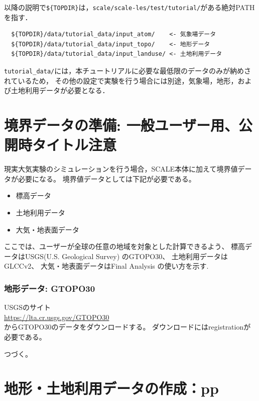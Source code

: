 以降の説明で\verb|${TOPDIR}|は，\verb|scale/scale-les/test/tutorial/|がある絶対PATHを指す．

\begin{verbatim}
  ${TOPDIR}/data/tutorial_data/input_atom/    <- 気象場データ
  ${TOPDIR}/data/tutorial_data/input_topo/    <- 地形データ
  ${TOPDIR}/data/tutorial_data/input_landuse/ <- 土地利用データ
\end{verbatim}
\verb|tutorial_data/|には，本チュートリアルに必要な最低限のデータのみが納めされているため，
その他の設定で実験を行う場合には別途，気象場，地形，および土地利用データが必要となる．


\section{境界データの準備: 一般ユーザー用、公開時タイトル注意}

現実大気実験のシミュレーションを行う場合，SCALE本体に加えて境界値データが必要になる。
境界値データとしては下記が必要である。
\begin{itemize}
\item 標高データ
\item 土地利用データ
\item 大気・地表面データ
\end{itemize}

ここでは、ユーザーが全球の任意の地域を対象とした計算できるよう、
標高データはUSGS(U.S. Geological Survey) のGTOPO30、
土地利用データはGLCCv2、
大気・地表面データはFinal Analysis の使い方を示す.


\subsubsection{地形データ: GTOPO30}

USGSのサイト\\
 \url{https://lta.cr.usgs.gov/GTOPO30}\\
からGTOPO30のデータをダウンロードする。
ダウンロードにはregistrationが必要である。


つづく。





\section{地形・土地利用データの作成：pp}

